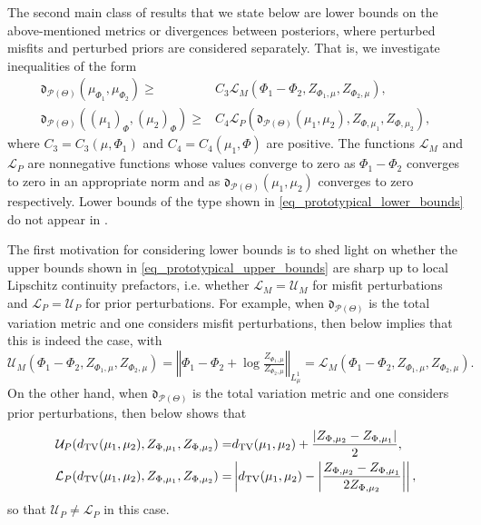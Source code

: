 \documentclass[a4paper]{scrartcl}
\theoremstyle{definition}
\numberwithin{equation}{section}
\newcommand{\abs}[1]{\vert #1\vert}
\newcommand{\Abs}[1]{\left\vert#1\right\vert}
\newcommand{\Norm}[1]{\left\Vert #1 \right\Vert}
\newcommand{\TV}[0]{\textup{TV}}
\begin{document}
The second main class of results that we state below are lower bounds on the above-mentioned metrics or divergences between posteriors, where perturbed misfits and perturbed priors are considered separately.
That is, we investigate inequalities of the form
\begin{subequations}
\label{eq_prototypical_lower_bounds}
\begin{align}
 \mathfrak{d}_{\mathcal{P}(\Theta)}(\mu_{\Phi_1},\mu_{\Phi_2})\geq & C_3\mathcal{L}_M(\Phi_1-\Phi_2,Z_{\Phi_1,\mu},Z_{\Phi_2,\mu}),
 \label{eq_prototypical_lower_bound_misfit_perturbation}
 \\
  \mathfrak{d}_{\mathcal{P}(\Theta)}((\mu_1)_{\Phi},(\mu_2)_{\Phi})\geq & C_4 \mathcal{L}_P(\mathfrak{d}_{\mathcal{P}(\Theta)}(\mu_1,\mu_2),Z_{\Phi,\mu_1},Z_{\Phi,\mu_2}),
  \label{eq_prototypical_lower_bound_prior_perturbation}
\end{align}
\end{subequations}
where $C_3=C_3(\mu,\Phi_1)$ and $C_4=C_4(\mu_1,\Phi)$ are positive.
The functions $\mathcal{L}_M$ and $\mathcal{L}_P$ are nonnegative functions whose values converge to zero as $\Phi_1-\Phi_2$ converges to zero in an appropriate norm and as $\mathfrak{d}_{\mathcal{P}(\Theta)}(\mu_1,\mu_2)$ converges to zero respectively.
Lower bounds of the type shown in \eqref{eq_prototypical_lower_bounds} do not appear in \cite{Sprungk2020}. 

The first motivation for considering lower bounds is to shed light on whether the upper bounds shown in \eqref{eq_prototypical_upper_bounds} are sharp up to local Lipschitz continuity prefactors, i.e. whether $\mathcal{L}_M=\mathcal{U}_M$ for misfit perturbations and $\mathcal{L}_P=\mathcal{U}_P$ for prior perturbations. 
For example, when $\mathfrak{d}_{\mathcal{P}(\Theta)}$ is the total variation metric and one considers misfit perturbations, then  below implies that this is indeed the case, with
\begin{equation*}
\mathcal{U}_M(\Phi_1-\Phi_2,Z_{\Phi_1,\mu},Z_{\Phi_2,\mu})= \Norm{\Phi_1-\Phi_2+\log \tfrac{Z_{\Phi_1,\mu}}{Z_{\Phi_2,\mu}} }_{L^1_\mu}=\mathcal{L}_M(\Phi_1-\Phi_2,Z_{\Phi_1,\mu},Z_{\Phi_2,\mu}).
\end{equation*}
On the other hand, when $\mathfrak{d}_{\mathcal{P}(\Theta)}$ is the total variation metric and one considers prior perturbations, then  below shows that 
\begin{align*}
\mathcal{U}_P(d_{\TV}(\mu_1,\mu_2),Z_{\Phi,\mu_1},Z_{\Phi,\mu_2})=& 
d_{\TV}(\mu_1,\mu_2)+\frac{\abs{Z_{\Phi,\mu_2}-Z_{\Phi,\mu_1}}}{2},
\\
\mathcal{L}_P(d_{\TV}(\mu_1,\mu_2),Z_{\Phi,\mu_1},Z_{\Phi,\mu_2})=& 
\Abs{d_{\TV}(\mu_1,\mu_2)- \Abs{ \frac{Z_{\Phi,\mu_2}-Z_{\Phi,\mu_1}}{2Z_{\Phi,\mu_2}} }},
\end{align*}
so that $\mathcal{U}_P\neq \mathcal{L}_P$ in this case.
\end{document}
